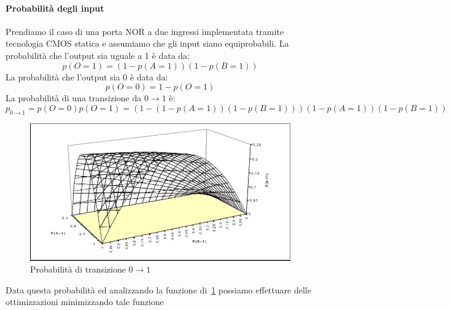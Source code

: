 \paragraph{Probabilità degli input}
Prendiamo il caso di una porta NOR a due ingressi implementata tramite tecnologia CMOS statica e assumiamo che gli input siano equiprobabili.
La probabilità che l'output sia uguale a 1 è data da:
$$p(O = 1) = (1-p(A = 1))(1-p(B = 1))$$
La probabilità che l'output sia 0 è data da:
$$p(O = 0) = 1 - p(O = 1)$$
La probabilità di una transizione da $0 \rightarrow 1$ è:
$$p_{0 \rightarrow 1} = p (O = 0)p(O = 1)=
(1-(1-p(A = 1))(1-p(B = 1)))(1-p(A = 1))(1 - p(B = 1))$$
\begin{figure}
\centering
\includegraphics[scale=0.5]{img/p01.png}
\caption{Probabilità di transizione $0 \rightarrow 1$}\label{fig:p01}
\end{figure}
Data questa probabilità ed analizzando la funzione di \figurename\,\ref{fig:p01} possiamo effettuare delle ottimizzazioni minimizzando tale funzione
